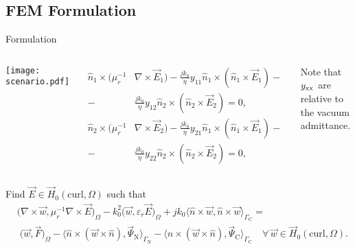 %
%

\subsection{FEM Formulation}

\begin{frame}[allowframebreaks]{Formulation}
  \begin{columns}
     \centering
    {\texttt{[image: scenario.pdf]}}
    {
      \begin{align*}
        \hat{n}_1\times(\mu_r^{-1}&\nabla\times\vec{E}_1) - \frac{jk_0}{\eta}y_{11}\hat{n}_1\times(\hat{n}_1\times\vec{E}_1) - \\
        - &\frac{jk_0}{\eta}y_{12}\hat{n}_2\times(\hat{n}_2\times\vec{E}_2) = 0,
      \end{align*}
      \begin{align*}
        \hat{n}_2\times(\mu_r^{-1}&\nabla\times\vec{E}_2) - \frac{jk_0}{\eta}y_{21}\hat{n}_1\times(\hat{n}_1\times\vec{E}_1) - \\
        - &\frac{jk_0}{\eta}y_{22}\hat{n}_2\times(\hat{n}_2\times\vec{E}_2) = 0,
      \end{align*}

      \alert{Note that $y_{\rm xx}$ are relative to the vacuum admittance.}
    }
  \end{columns}

  \framebreak %

  Find $\vec{E} \in \vec{H}_0(\text{curl},\Omega)$ such that
  \begin{align*}
    &\Big(\nabla\times\vec{w},\mu_r^{-1}\nabla\times\vec{E} \Big)_\Omega - k_0^2\Big(\vec{w},\varepsilon_r\vec{E} \Big)_\Omega + 
    jk_0\Big\langle\hat{n}\times\vec{w},\hat{n}\times\vec{w}\Big\rangle_{\Gamma_{\text{C}}} = \\
    &\;\Big(\vec{w},\vec{F}\Big)_\Omega - 
    \Big\langle\hat{n}\times(\vec{w}\times\hat{n}),\vec{\Psi}_{\text{N}}\Big\rangle_{\Gamma_{\text{N}}} -
    \Big\langle\hat{n}\times(\vec{w}\times\hat{n}),\vec{\Psi}_{\text{C}}\Big\rangle_{\Gamma_{\text{C}}}
    \quad \forall \,\vec{w} \in \vec{H}_0(\text{curl},\Omega).
  \end{align*}
  

\end{frame}
